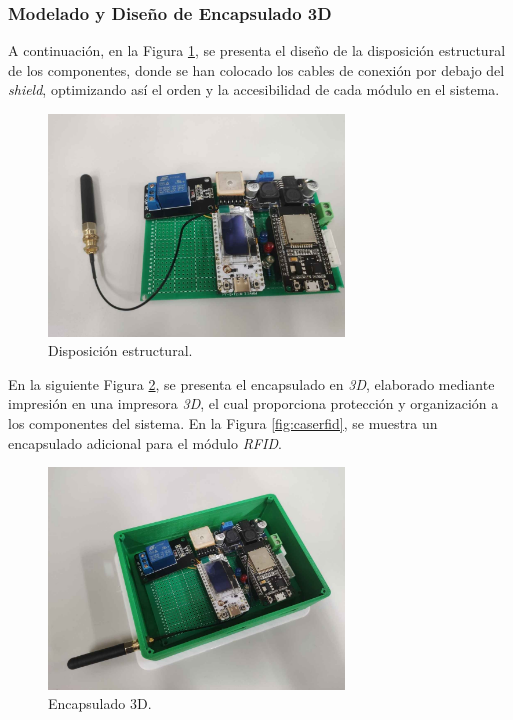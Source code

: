 \subsubsection{Modelado y Diseño de Encapsulado 3D}

A continuación, en la Figura \ref{fig:disposicion}, se presenta el diseño de la disposición estructural de los componentes, donde se han colocado los cables de conexión por debajo del \textit{shield}, optimizando así el orden y la accesibilidad de cada módulo en el sistema.

\begin{figure}[H]
\leavevmode
\begin{minipage}{\textwidth}
\begin{center}
\includegraphics[width=0.7\textwidth]{./capitulo_05/imagen/montajecompleto.jpg}
\caption{Disposición estructural.\label{fig:disposicion}}
\end{center}
\end{minipage}
\end{figure}

En la siguiente Figura \ref{fig:integracion}, se presenta el encapsulado en \textit{3D}, elaborado mediante impresión en una impresora \textit{3D}, el cual proporciona protección y organización a los componentes del sistema. En la Figura \ref{fig:caserfid}, se muestra un encapsulado adicional para el módulo \textit{RFID}.

\begin{figure}[H]
\leavevmode
\begin{minipage}{\textwidth}
\begin{center}
\includegraphics[width=0.7\textwidth]{./capitulo_05/imagen/montajecompleto1.jpg}
\caption{Encapsulado 3D.\label{fig:integracion}}
\end{center}
\end{minipage}
\end{figure}

